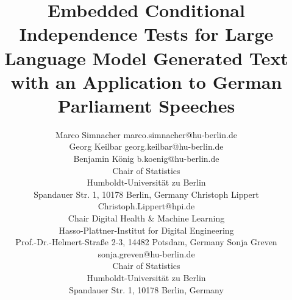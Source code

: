 \documentclass[twoside,11pt]{article}
\begin{document}
\title{Embedded Conditional Independence Tests for Large Language Model Generated Text with an Application to German Parliament Speeches}

\author{\name Marco Simnacher \email marco.simnacher@hu-berlin.de \\
        \name Georg Keilbar \email georg.keilbar@hu-berlin.de \\
        \name Benjamin König \email b.koenig@hu-berlin.de \\
       \addr Chair of Statistics\\
       Humboldt-Universität zu Berlin\\
       Spandauer Str. 1, 10178 Berlin, Germany
       \AND
        \name Christoph Lippert \email Christoph.Lippert@hpi.de \\
       \addr Chair Digital Health \& Machine Learning\\
       Hasso-Plattner-Institut for Digital Engineering\\
       Prof.-Dr.-Helmert-Straße 2-3, 14482 Potsdam, Germany
        \AND
       \name Sonja Greven \email sonja.greven@hu-berlin.de\\
       \addr Chair of Statistics\\
       Humboldt-Universität zu Berlin\\
       Spandauer Str. 1, 10178 Berlin, Germany}


\maketitle
\end{document}
